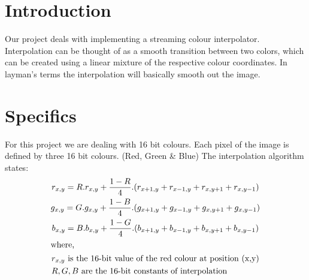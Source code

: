 \documentclass[a4paper,12pt]{article}
\begin{document}
\section{Introduction}
Our project deals with implementing a streaming colour interpolator. Interpolation can be thought of as a smooth transition between two colors, which can be created using a linear mixture of the respective colour coordinates. In layman's terms the interpolation will basically smooth out the image.

\section{Specifics}
For this project we are dealing with 16 bit colours. Each pixel of the image is defined by three 16 bit colours. (Red, Green \& Blue) The interpolation algorithm states:
\begin{gather}
r_{x,y} = R.r_{x,y} + \frac{1-R}{4}.(r_{x+1,y} + r_{x-1,y} + r_{x,y+1} + r_{x,y-1})\\
g_{x,y} = G.g_{x,y} + \frac{1-B}{4}.(g_{x+1,y} + g_{x-1,y} + g_{x,y+1} + g_{x,y-1})\\
b_{x,y} = B.b_{x,y} + \frac{1-G}{4}.(b_{x+1,y} + b_{x-1,y} + b_{x,y+1} + b_{x,y-1})\\
\intertext{where,}
\begin{aligned}
 &r_{x,y} \text{  is the 16-bit value of the red colour at position (x,y)}\\
 &R, G, B \text{ are the 16-bit constants of interpolation}
\end{aligned}\notag
\end{gather}
\end{document}
